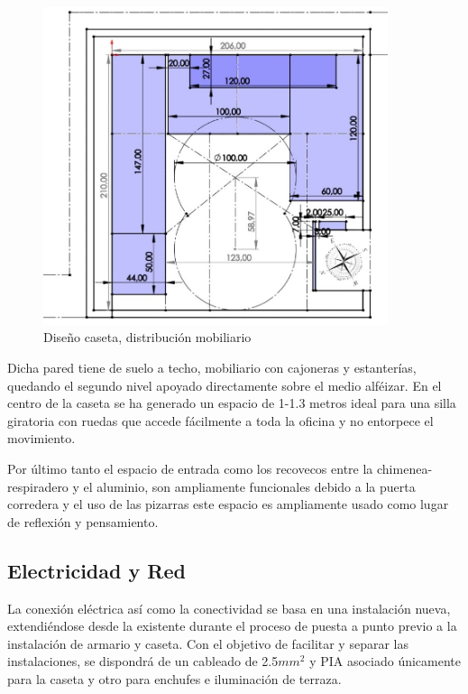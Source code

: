 \begin{figure}[htb]
\begin{center}
\includegraphics[width=0.9\textwidth]{./figuras/planos_caseta.jpg}
\caption{Diseño caseta, distribución mobiliario}
\label{F:planos_caseta}
\end{center}
\end{figure}

Dicha pared tiene de suelo a techo, mobiliario con cajoneras y estanterías, quedando el segundo nivel apoyado directamente sobre el medio alféizar. En el centro de la caseta se ha generado un espacio de 1-1.3 metros ideal para una silla giratoria con ruedas que accede fácilmente a toda la oficina y no entorpece el movimiento.

Por último tanto el espacio de entrada como los recovecos entre la chimenea-respiradero y el aluminio, son ampliamente funcionales debido a la puerta corredera y el uso de las pizarras este espacio es ampliamente usado como lugar de reflexión y pensamiento.

\subsection{Electricidad y Red}

La conexión eléctrica así como la conectividad se basa en una instalación nueva, extendiéndose desde la existente durante el proceso de puesta a punto previo a la instalación de armario y caseta. Con el objetivo de facilitar y separar las instalaciones, se dispondrá de un cableado de 2.5$mm^{2}$ y PIA asociado únicamente para la caseta y otro para enchufes e iluminación de terraza.

